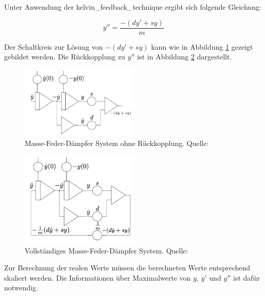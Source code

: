 Unter Anwendung der \gls{kelvin_feedback_technique} ergibt sich folgende Gleichung:

\[y''=\frac{-(dy'+sy)}{m}\]

Der Schaltkreis zur Lösung von \(-(dy'+sy)\) kann wie in Abbildung \ref{fig:Feder-Masse-Dämpfer System} gezeigt gebildet werden. Die Rückkopplung zu \(y''\) ist in Abbildung \ref{fig:Feder-Masse-Dämpfer System mit Rückkopplung} dargestellt.

\begin{figure}[h]
  \includegraphics[width=0.5\textwidth]{abbildungen/feder_masse_daempfer.png}
  \caption{Masse-Feder-Dämpfer System ohne Rückkopplung. Quelle: \cite[S. 170]{Ulmann2022}}
  \label{fig:Feder-Masse-Dämpfer System}
\end{figure}

\begin{figure}[h]
  \includegraphics[width=0.5\textwidth]{abbildungen/feder_masse_daempfer_mit_rueckkopplung.png}
  \caption{Vollständiges Masse-Feder-Dämpfer System. Quelle: \cite[S. 170]{Ulmann2022}}
  \label{fig:Feder-Masse-Dämpfer System mit Rückkopplung}
\end{figure}

Zur Berechnung der realen Werte müssen die berechneten Werte entsprechend skaliert werden. Die Informationen über Maximalwerte von \(y\), \(y'\) und \(y''\) ist dafür notwendig.
